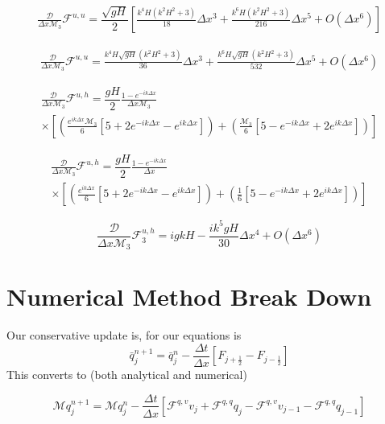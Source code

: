 \documentclass[12pt]{article}
\begin{document}
\begin{multline*}
\frac{\mathcal{D}}{\Delta x\mathcal{M}_3}\mathcal{F}^{u,u} = \dfrac{ \sqrt{gH}}{ 2} \left[\frac{k^4H\left(k^2H^2 + 3\right)}{18}\Delta x ^3 + \frac{k^6H\left(k^2H^2 + 3\right)}{216} \Delta x^5 +  O(\Delta x^6)\right] 
\end{multline*}

\begin{multline*}
\frac{\mathcal{D}}{\Delta x\mathcal{M}_3}\mathcal{F}^{u,u} = \frac{k^4H\sqrt{gH}\left(k^2H^2 + 3\right)}{36}\Delta x ^3 + \frac{k^6H\sqrt{gH}\left(k^2H^2 + 3\right)}{532} \Delta x^5 +  O(\Delta x^6)
\end{multline*}

\begin{multline*}
\frac{\mathcal{D}}{\Delta x\mathcal{M}_3}\mathcal{F}^{u,h} = \dfrac{ gH}{ 2} \frac{1 -e^{-ik\Delta x}}{\Delta x \mathcal{M}_3} \\ \times \left [ \left(\frac{e^{ik\Delta x } \mathcal{M}_3}{6}\left[5 + 2e^{-ik\Delta x} - e^{ik\Delta x} \right]\right) +  \left(\frac{\mathcal{M}_3}{6}\left[5  - e^{-ik\Delta x} + 2e^{ik\Delta x} \right]\right) \right ]
\end{multline*}

\begin{multline*}
\frac{\mathcal{D}}{\Delta x\mathcal{M}_3}\mathcal{F}^{u,h} = \dfrac{ gH}{ 2} \frac{1 -e^{-ik\Delta x}}{\Delta x} \\ \times \left [ \left(\frac{e^{ik\Delta x }}{6}\left[5 + 2e^{-ik\Delta x} - e^{ik\Delta x} \right]\right) +  \left(\frac{1}{6}\left[5  - e^{-ik\Delta x} + 2e^{ik\Delta x} \right]\right) \right ]
\end{multline*}


\[\frac{\mathcal{D}}{\Delta x\mathcal{M}_3}\mathcal{F}_3^{u,h} = igkH  - \frac{ik^5gH }{30} \Delta x ^4 + O(\Delta x ^6) \]

\section{Numerical Method Break Down}
Our conservative update is, for our equations is
\[\bar{q}_j^{n+1} = \bar{q}_j^{n} - \frac{\Delta t}{\Delta x} \left[F_{j + \frac{1}{2}} - F_{j - \frac{1}{2}} \right] \]
This converts to (both analytical and numerical)

\[\mathcal{M}q_j^{n+1} = \mathcal{M}q_j^{n} - \frac{\Delta t}{\Delta x} \left[\mathcal{F}^{q,v}v_{j} + \mathcal{F}^{q,q}q_{j} - \mathcal{F}^{q,v}v_{j-1} - \mathcal{F}^{q,q}q_{j-1} \right] \]
\end{document}
